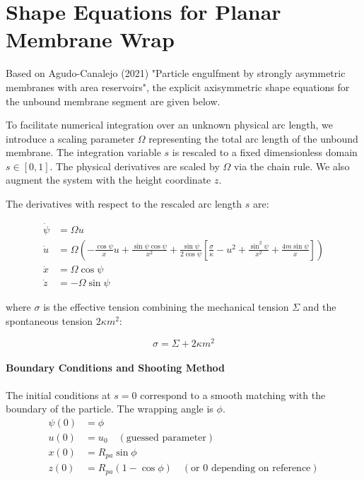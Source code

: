 \documentclass[11pt]{article}
\begin{document}
\section*{Shape Equations for Planar Membrane Wrap}

Based on Agudo-Canalejo (2021) "Particle engulfment by strongly asymmetric membranes with area reservoirs", the explicit axisymmetric shape equations for the unbound membrane segment are given below. 

To facilitate numerical integration over an unknown physical arc length, we introduce a scaling parameter $\Omega$ representing the total arc length of the unbound membrane. The integration variable $s$ is rescaled to a fixed dimensionless domain $s \in [0, 1]$. The physical derivatives are scaled by $\Omega$ via the chain rule. We also augment the system with the height coordinate $z$.

The derivatives with respect to the rescaled arc length $s$ are:

\begin{align}
\dot{\psi} &= \Omega u \\
\dot{u} &= \Omega \left( -\frac{\cos \psi}{x} u + \frac{\sin \psi \cos \psi}{x^2} + \frac{\sin \psi}{2 \cos \psi } \left[ \frac{\sigma}{\kappa} - u^2 + \frac{\sin^2 \psi}{x^2} + \frac{4 m \sin \psi}{x} \right] \right) \\
\dot{x} &= \Omega \cos \psi \\
\dot{z} &= -\Omega \sin \psi
\end{align}

where $\sigma$ is the effective tension combining the mechanical tension $\Sigma$ and the spontaneous tension $2 \kappa m^2$:

\begin{equation}
\sigma = \Sigma + 2 \kappa m^2
\end{equation}

\paragraph{Boundary Conditions and Shooting Method}
The initial conditions at $s=0$ correspond to a smooth matching with the boundary of the particle. The wrapping angle is $\phi$.
\begin{align*}
\psi(0) &= \phi \\
u(0) &= u_0 \quad (\text{guessed parameter}) \\
x(0) &= R_{pa} \sin \phi \\
z(0) &= R_{pa} (1 - \cos \phi) \quad (\text{or } 0 \text{ depending on reference})
\end{align*}
\end{document}
